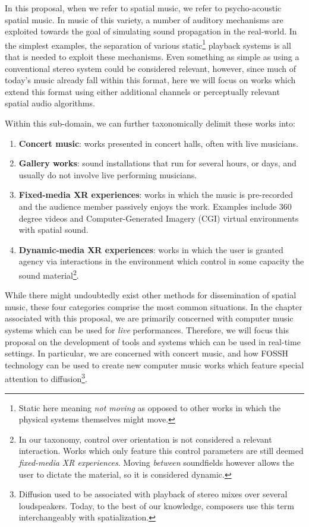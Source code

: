 In this proposal, when we refer to spatial music, we refer to psycho-acoustic spatial music. In music of this variety, a number of auditory mechanisms are exploited towards the goal of simulating sound propagation in the real-world. In the simplest examples, the separation of various static\footnote{Static here meaning \textit{not moving} as opposed to other works in which the physical systems themselves might move.} playback systems is all that is needed to exploit these mechanisms. Even something as simple as using a conventional stereo system could be considered relevant, however, since much of today's music already fall within this format, here we will focus on works which extend this format using either additional channels or perceptually relevant spatial audio algorithms. 

Within this sub-domain, we can further taxonomically delimit these works into:
\begin{enumerate}
    \item \textbf{Concert music}: works presented in concert halls, often with live musicians. 
    \item \textbf{Gallery works}: sound installations that run for several hours, or days, and usually do not involve live performing musicians. 
    \item \textbf{Fixed-media XR experiences}: works in which the music is pre-recorded and the audience member passively enjoys the work. Examples include 360 degree videos and Computer-Generated Imagery (CGI) virtual environments with spatial sound. 
    \item \textbf{Dynamic-media XR experiences}: works in which the user is granted agency via interactions in the environment which control in some capacity the sound material\footnote{In our taxonomy, control over orientation is not considered a relevant interaction. Works which only feature this control parameters are still deemed \textit{fixed-media XR experiences}. Moving \textit{between} soundfields however allows the user to dictate the material, so it is considered dynamic.}.
\end{enumerate}

While there might undoubtedly exist other methods for dissemination of spatial music, these four categories comprise the most common situations. In the chapter associated with this proposal, we are primarily concerned with computer music systems which can be used for \textit{live} performances. Therefore, we will focus this proposal on the development of tools and systems which can be used in real-time settings. In particular, we are concerned with concert music, and how FOSSH technology can be used to create new computer music works which feature special attention to diffusion\footnote{Diffusion used to be associated with playback of stereo mixes over several loudspeakers. Today, to the best of our knowledge, composers use this term interchangeably with spatialization.}.

